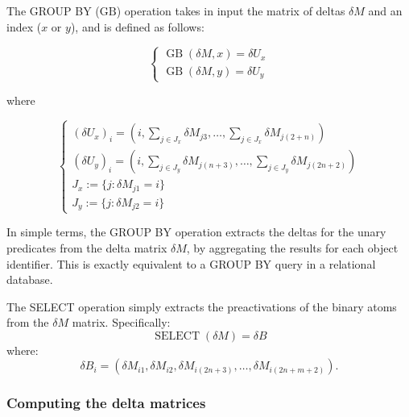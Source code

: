 \begin{definition}[GROUP BY]
	The GROUP BY ($\text{GB}$) operation takes in input the matrix of deltas $\delta M$ and an index ($x$ or $y$), and is defined as follows:
	
	\begin{equation*}
	\begin{cases}
	\operatorname{GB}(\delta M, x)= \delta U_x\\
	\operatorname{GB}(\delta M, y)= \delta U_y
	\end{cases}
	\end{equation*}
		
	where 
	
	\begin{equation*}
	\begin{cases}
	\left(\delta U_x \right)_i = \left(i, \sum_{j\in J_x}\delta M_{j3},\dots, \sum_{j \in J_x}\delta M_{j(2+n)}\right)\\
	\left(\delta U_y \right)_i = \left(i, \sum_{j\in J_y}\delta M_{j(n+3)},\dots, \sum_{j \in J_y}\delta M_{j(2n+2)}\right)\\
	J_x:=\{j:\delta M_{j1}=i\}\\
	J_y:=\{j:\delta M_{j2}=i\}
	\end{cases}
	\end{equation*}
\end{definition}

In simple terms, the GROUP BY operation extracts the deltas for the unary predicates from the delta matrix $\delta M$, by aggregating the results for each object identifier. This is exactly equivalent to a GROUP BY query in a relational database.

\begin{definition}[SELECT]
The SELECT operation simply extracts the preactivations of the binary atoms from the $\delta M$ matrix. Specifically:
$$\operatorname{SELECT}(\delta M) = \delta B $$
where:
$$\delta B_i = \left(\delta M_{i1}, \delta M_{i2}, \delta M_{i(2n+3)},\dots, \delta M_{i(2n+m+2)}\right).$$
\end{definition}

\subsubsection{Computing the delta matrices} 

